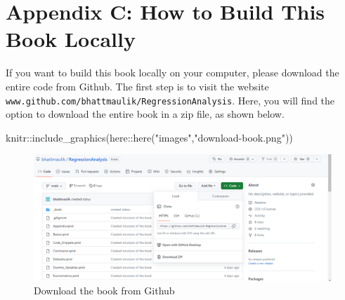 \documentclass[
  letterpaper,
  twoside,
  openright,
  headsepline,
  footsepline,
  listof = totocnumbered,
  chapterprefix = true,
  titlepage = false]{scrbook}
\newenvironment{Shaded}{\begin{snugshade}}{\end{snugshade}}
\newcommand{\FunctionTok}[1]{\textcolor[rgb]{0.28,0.35,0.67}{#1}}
\newcommand{\NormalTok}[1]{\textcolor[rgb]{0.00,0.23,0.31}{#1}}
\newcommand{\SpecialCharTok}[1]{\textcolor[rgb]{0.37,0.37,0.37}{#1}}
\newcommand{\StringTok}[1]{\textcolor[rgb]{0.13,0.47,0.30}{#1}}
\begin{document}

\setcounter{figure}{0}
\renewcommand{\thefigure}{B.\arabic{figure}} 
\setcounter{table}{0}
\renewcommand{\thetable}{B.\arabic{table}}

\hypertarget{appendix-c-how-to-build-this-book-locally}{%
\chapter*{Appendix C: How to Build This Book
Locally}\label{appendix-c-how-to-build-this-book-locally}}


\setcounter{figure}{0}
\renewcommand{\thefigure}{C.\arabic{figure}}
\setcounter{table}{0}
\renewcommand{\thetable}{C.\arabic{table}}

If you want to build this book locally on your computer, please download
the entire code from Github. The first step is to visit the website
\texttt{www.github.com/bhattmaulik/RegressionAnalysis}. Here, you will
find the option to download the entire book in a zip file, as shown
below.

\begin{Shaded}
\begin{Highlighting}[numbers=left,,]
\NormalTok{knitr}\SpecialCharTok{::}\FunctionTok{include\_graphics}\NormalTok{(here}\SpecialCharTok{::}\FunctionTok{here}\NormalTok{(}\StringTok{"images"}\NormalTok{,}\StringTok{"download{-}book.png"}\NormalTok{))}
\end{Highlighting}
\end{Shaded}

\begin{figure}[H]

{\centering \includegraphics[width=4.43in,height=\textheight]{images/download-book.png}

}

\caption{\label{fig-download-book}Download the book from Github}

\end{figure}
\end{document}
